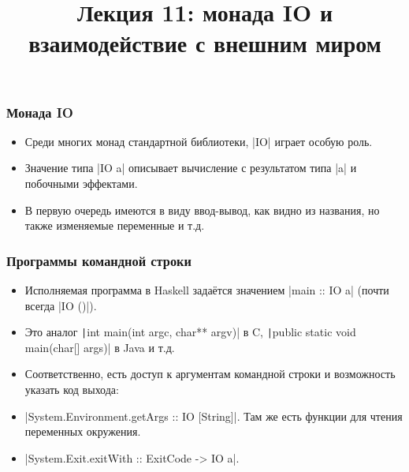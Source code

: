 \documentclass[11pt]{beamer}
\title{Лекция 11: монада IO и взаимодействие с внешним миром}
\begin{document}
\begin{frame}[plain]
  \maketitle
\end{frame}

\begin{frame}[fragile]
  \frametitle{Монада IO}
  \begin{itemize}
    \item Среди многих монад стандартной библиотеки, \haskinline|IO| играет особую роль.
    \item Значение типа \haskinline|IO a| описывает вычисление с результатом типа \haskinline|a| и побочными эффектами.
    \item В первую очередь имеются в виду ввод-вывод, как видно из названия, но также изменяемые переменные и т.д.
  \end{itemize}
\end{frame}

\begin{frame}[fragile]
  \frametitle{Программы командной строки}
  \begin{itemize}
    \item Исполняемая программа в Haskell задаётся значением
          \haskinline|main :: IO a| (почти всегда \haskinline|IO ()|).
    \item Это аналог \texttt|int main(int argc, char** argv)| в C, \texttt|public static void main(char[] args)| в Java и т.д.
    \item Соответственно, есть доступ к аргументам командной строки и возможность указать код выхода:
    \item \haskinline|System.Environment.getArgs :: IO [String]|. Там же есть функции для чтения переменных окружения.
    \item \haskinline|System.Exit.exitWith :: ExitCode -> IO a|.
  \end{itemize}
\end{frame}
\end{document}
